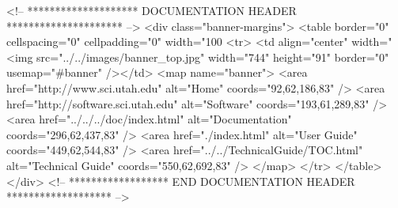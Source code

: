 \documentclass[11pt]{article}
\begin{document}


\begin{rawhtml}
<!-- ******************** DOCUMENTATION HEADER ********************* -->
<div class="banner-margins">
<table border="0" cellspacing="0" cellpadding="0" width="100%
<tr>
<td align="center" width="%
<img src="../../images/banner_top.jpg" width="744" height="91" border="0" usemap="#banner" /></td>
<map name="banner">
<area href="http://www.sci.utah.edu" alt="Home" coords="92,62,186,83" />
<area href="http://software.sci.utah.edu" alt="Software" coords="193,61,289,83" />
<area href="../../../doc/index.html" alt="Documentation" coords="296,62,437,83" />
<area href="./index.html" alt="User Guide" coords="449,62,544,83" />
<area href="../../TechnicalGuide/TOC.html" alt="Technical Guide" coords="550,62,692,83" />
</map>
</tr>
</table>
</div>
<!-- ****************** END DOCUMENTATION HEADER ******************* -->
\end{rawhtml}


\newpage
\tableofcontents
\newpage



\newpage




%

%

\newpage
%
\newpage
%

\newpage


\newpage
\printindex
\end{document}
